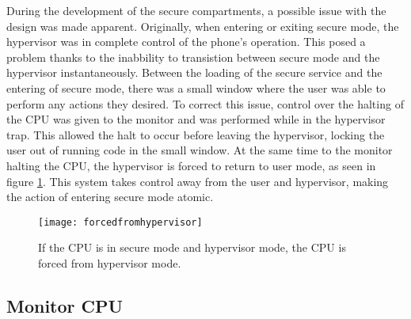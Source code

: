 During the development of the secure compartments, a possible issue with the design was made apparent. Originally, when entering or exiting secure mode, the hypervisor was in complete control of the phone's operation. This posed a problem thanks to the inabbility to transistion between secure mode and the hypervisor instantaneously. Between the loading of the secure service and the entering of secure mode, there was a small window where the user was able to perform any actions they desired. To correct this issue, control over the halting of the CPU was given to the monitor and was performed while in the hypervisor trap. This allowed the halt to occur before leaving the hypervisor, locking the user out of running code in the small window.  At the same time to the monitor halting the CPU, the hypervisor is forced to return to user mode, as seen in figure \ref{fig:forcedfromhypervisor}. This system takes control away from the user and hypervisor, making the action of entering secure mode atomic. 

\begin{figure}
  \centering
  \texttt{[image: forcedfromhypervisor]}
  \caption{If the CPU is in secure mode and hypervisor mode, the CPU is forced from hypervisor mode.}
  \label{fig:forcedfromhypervisor}
\end{figure}


\subsection{Monitor CPU}

\label{Ch6 Sec4 Sub2}
